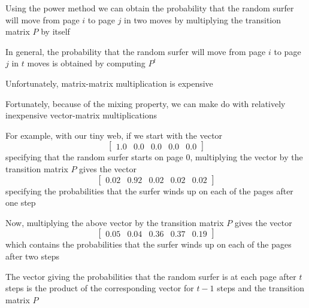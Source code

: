 \documentclass[8pt,a4paper,compress]{beamer}
\begin{document}
\begin{frame}[fragile]
\pause

Using the power method we can obtain the probability that the random surfer will move from page $i$ to page $j$ in two moves by multiplying the transition matrix $P$ by itself

\pause
\bigskip

In general, the probability that the random surfer will move from page $i$ to page $j$ in $t$ moves is obtained by computing $P^t$ 

\pause
\bigskip 

Unfortunately, matrix-matrix multiplication is expensive

\pause
\bigskip

Fortunately, because of the mixing property, we can make do with relatively inexpensive vector-matrix multiplications
\end{frame}

\begin{frame}[fragile]
\pause

For example, with our tiny web, if we start with the vector 
\[
\begin{bmatrix}
1.0 & 0.0 & 0.0 & 0.0 & 0.0
\end{bmatrix}
\]
specifying that the random surfer starts on page 0, multiplying the vector by the transition matrix $P$ gives the vector 
\[
\begin{bmatrix}
0.02 & 0.92 & 0.02 & 0.02 & 0.02
\end{bmatrix}
\]
specifying the probabilities that the surfer winds up on each of the pages after one step

\pause
\bigskip

Now, multiplying the above vector by the transition matrix $P$ gives the vector
\[
\begin{bmatrix}
0.05 & 0.04 & 0.36 & 0.37 & 0.19
\end{bmatrix}
\]
which contains the probabilities that the surfer winds up on each of the pages after two steps

\pause
\bigskip

The vector giving the probabilities that the random surfer is at each page after $t$ steps is the product of the corresponding vector for $t-1$ steps and the transition matrix $P$
\end{frame}
\end{document}

